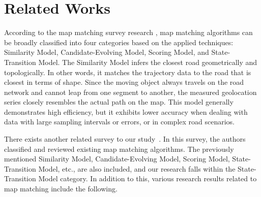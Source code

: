 \documentclass[preprint,12pt]{elsarticle}
\begin{document}
\section{Related Works}
\label{sec:sec2}
According to the map matching survey research \cite{chao2020survey}, map matching algorithms can be broadly classified into four categories based on the applied techniques: Similarity Model, Candidate-Evolving Model, Scoring Model, and State-Transition Model.
The Similarity Model infers the closest road geometrically and topologically. In other words, it matches the trajectory data to the road that is closest in terms of shape. Since the moving object always travels on the road network and cannot leap from one segment to another, the measured geolocation series closely resembles the actual path on the map. This model generally demonstrates high efficiency, but it exhibits lower accuracy when dealing with data with large sampling intervals or errors, or in complex road scenarios.

There exists another related survey to our study~\cite{jiang2022driving}. In this survey, the authors classified and reviewed existing map matching algorithms. The previously mentioned Similarity Model, Candidate-Evolving Model, Scoring Model, State-Transition Model, etc., are also included, and our research falls within the State-Transition Model category. In addition to this, various research results related to map matching include the following.
\end{document}
